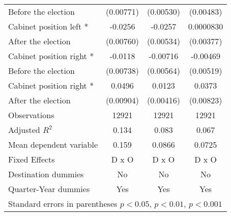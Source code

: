 \begin{table}[!ht]
\begin{tabular}{l*{3}{c}}
 Before the election                   &   (0.00771)         &   (0.00530)         &   (0.00483)         \\
[0.5em]
Cabinet position left * &     -0.0256\sym{**} &     -0.0257\sym{***}&   0.0000830         \\
 After the election                   &   (0.00760)         &   (0.00534)         &   (0.00377)         \\
[0.5em]
Cabinet position right * &     -0.0118         &    -0.00716         &    -0.00469         \\
 Before the election                   &   (0.00738)         &   (0.00564)         &   (0.00519)         \\
[0.5em]
Cabinet position right * &      0.0496\sym{***}&      0.0123\sym{**} &      0.0373\sym{***}\\
After the election                    &   (0.00904)         &   (0.00416)         &   (0.00823)         \\
\hline
Observations        &       12921         &       12921         &       12921         \\
Adjusted \(R^{2}\)  &       0.134         &       0.083         &       0.067         \\
Mean dependent variable&       0.159         &      0.0866         &      0.0725         \\
Fixed Effects       &       D x O         &       D x O         &       D x O         \\
Destination dummies &          No         &          No         &          No         \\
Quarter-Year dummies&         Yes         &         Yes         &         Yes         \\
\hline\hline
\multicolumn{4}{l}{Standard errors in parentheses \sym{*} \(p<0.05\), \sym{**} \(p<0.01\), \sym{***} \(p<0.001\)}\\
\end{tabular}
\label{dec_table1_baseline}
\end{table}

